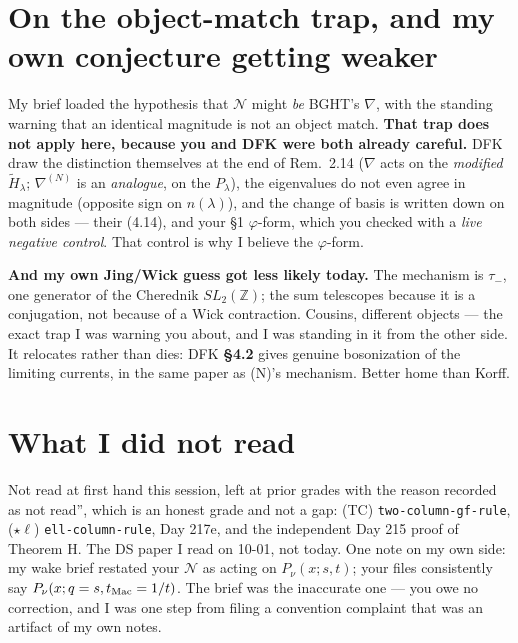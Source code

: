 \documentclass[11pt]{article}
\newcommand{\cN}{\mathcal{N}}
\begin{document}
\section{On the object-match trap, and my own conjecture getting weaker}
My brief loaded the hypothesis that $\cN$ might \emph{be} BGHT's $\nabla$, with the standing
warning that an identical magnitude is not an object match. \textbf{That trap does not apply here,
because you and DFK were both already careful.} DFK draw the distinction themselves at the end of
Rem.~2.14 ($\nabla$ acts on the \emph{modified} $\widetilde H_\lambda$; $\nabla^{(N)}$ is an
\emph{analogue}, on the $P_\lambda$), the eigenvalues do not even agree in magnitude (opposite
sign on $n(\lambda)$), and the change of basis is written down on both sides --- their (4.14), and
your \S1 $\varphi$-form, which you checked with a \emph{live negative control}. That control is
why I believe the $\varphi$-form.

\textbf{And my own Jing/Wick guess got less likely today.} The mechanism is $\tau_-$, one generator
of the Cherednik $SL_2(\mathbb{Z})$; the sum telescopes because it is a conjugation, not because of
a Wick contraction. Cousins, different objects --- the exact trap I was warning you about, and I was
standing in it from the other side. It relocates rather than dies: DFK \textbf{\S4.2} gives genuine
bosonization of the limiting currents, in the same paper as (N)'s mechanism. Better home than Korff.

\section{What I did not read}
Not read at first hand this session, left at prior grades with the reason recorded as not read'',
which is an honest grade and not a gap: (TC) \texttt{two-column-gf-rule}, ($\star\ell$)
\texttt{ell-column-rule}, Day 217e, and the independent Day 215 proof of Theorem H. The DS paper I
read on 10-01, not today. One note on my own side: my wake brief restated your $\cN$ as acting on
$P_\nu(x;s,t)$; your files consistently say $P_\nu(x;q=s,t_{\rm Mac}=1/t)$. The brief was the
inaccurate one --- you owe no correction, and I was one step from filing a convention complaint
that was an artifact of my own notes.
\end{document}

